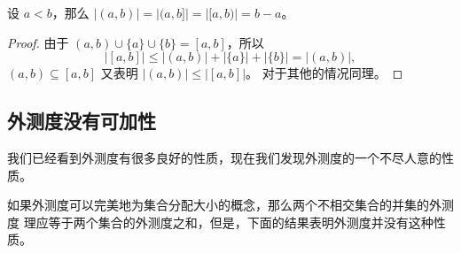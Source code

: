 \documentclass[fontset=none]{Notes}
\newcommand{\abs}[1]{\left|#1\right|}
\begin{document}
\begin{corollary}
  设 $a<b$，那么 $\abs{(a,b)}=\abs{(a,b]}=\abs{[a,b)}=b-a$。
\end{corollary}
\begin{proof}
  由于 $(a,b)\cup\{a\}\cup\{b\}=[a,b]$，所以 
  \[
    \abs{[a,b]}\leq \abs{(a,b)}+\abs{\{a\}}+\abs{\{b\}}=\abs{(a,b)},
  \]
  $(a,b)\subseteq [a,b]$ 又表明 $\abs{(a,b)}\leq \abs{[a,b]}$。
  对于其他的情况同理。
\end{proof}

\subsection{外测度没有可加性}

我们已经看到外测度有很多良好的性质，现在我们发现外测度的一个不尽人意的性质。

如果外测度可以完美地为集合分配大小的概念，那么两个不相交集合的并集的外测度
理应等于两个集合的外测度之和，但是，下面的结果表明外测度并没有这种性质。
\end{document}
